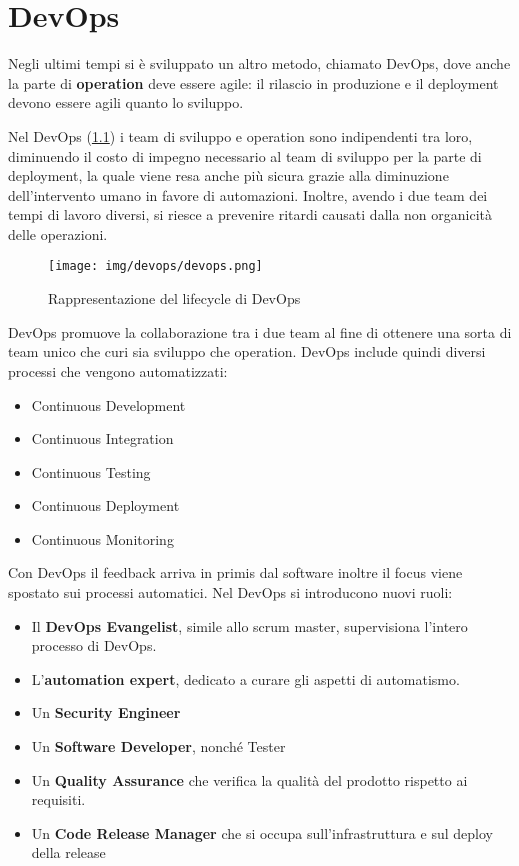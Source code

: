 \chapter{DevOps}
Negli ultimi tempi si è sviluppato un altro metodo, chiamato DevOps, dove anche
la parte di \textbf{operation} deve essere agile: il rilascio in produzione e il
deployment devono essere agili quanto lo
sviluppo.

Nel DevOps (\ref{fig:devops}) i team di sviluppo e operation sono indipendenti
tra loro, diminuendo il costo di impegno necessario al team di sviluppo per la
parte di deployment, la quale viene resa anche più sicura grazie alla diminuzione
dell'intervento umano in favore di automazioni. Inoltre, avendo i due team dei
tempi di lavoro diversi, si riesce a prevenire ritardi causati dalla non
organicità delle operazioni.
\begin{figure}[!ht]
      \centering
      \texttt{[image: img/devops/devops.png]}
      \caption{Rappresentazione del lifecycle di DevOps}
      \label{fig:devops}
\end{figure}
DevOps promuove la collaborazione tra i due team al fine di ottenere una sorta
di team unico che curi sia sviluppo che operation. DevOps include quindi diversi
processi che vengono automatizzati:
\begin{itemize}
      \item Continuous Development
      \item Continuous Integration
      \item Continuous Testing
      \item Continuous Deployment
      \item Continuous Monitoring
\end{itemize}
Con DevOps il feedback arriva in primis dal software inoltre il focus viene
spostato sui processi automatici. Nel DevOps si introducono nuovi ruoli:
\begin{itemize}
      \item Il \textbf{DevOps Evangelist}, simile allo scrum master, supervisiona
            l'intero processo di DevOps.
      \item L'\textbf{automation expert}, dedicato a curare gli aspetti di
            automatismo.
      \item Un \textbf{Security Engineer}
      \item Un \textbf{Software Developer}, nonché Tester
      \item Un \textbf{Quality Assurance} che verifica la qualità del prodotto
            rispetto ai requisiti.
      \item Un\textbf{ Code Release Manager} che si occupa sull'infrastruttura e
            sul deploy della release
\end{itemize}
